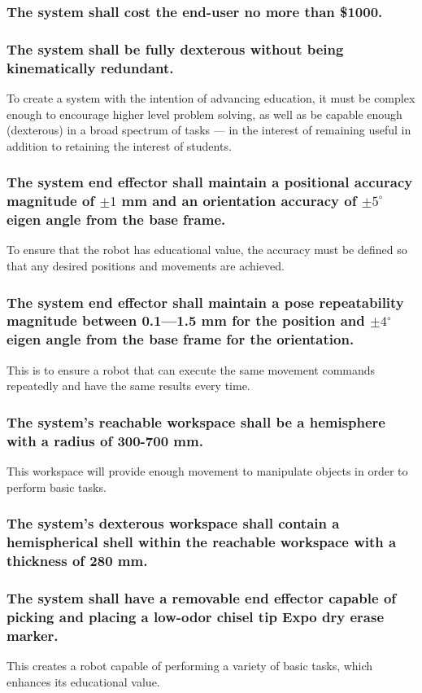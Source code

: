\documentclass[12pt]{report}
\begin{document}
\subsubsection{The system shall cost the end-user no more than \$1000.}
\subsubsection{The system shall be fully dexterous without being kinematically redundant.}
To create a system with the intention of advancing education, it must be complex enough to encourage higher level problem solving, as well as be capable enough (dexterous) in a broad spectrum of tasks — in the interest of remaining useful in addition to retaining the interest of students.

\subsubsection{The system end effector shall maintain a positional accuracy magnitude of \(\pm 1\) mm and an orientation accuracy of \(\pm 5^{\circ}\) eigen angle from the base frame.}
To ensure that the robot has educational value, the accuracy must be defined so that any desired positions and movements are achieved.

\subsubsection{The system end effector shall maintain a pose repeatability magnitude between 0.1—1.5 mm for the position and \(\pm 4^{\circ}\) eigen angle from the base frame for the orientation.}
This is to ensure a robot that can execute the same movement commands repeatedly and have the same results every time.

\subsubsection{The system’s reachable workspace shall be a hemisphere with a radius of 300-700 mm.}
This workspace will provide enough movement to manipulate objects in order to perform basic tasks.

\subsubsection{The system’s dexterous workspace shall contain a hemispherical shell within the reachable workspace with a thickness of 280 mm.}

\subsubsection{The system shall have a removable end effector capable of picking and placing a low-odor chisel tip Expo dry erase marker.}
This creates a robot capable of performing a variety of basic tasks, which enhances its educational value.
\end{document}
